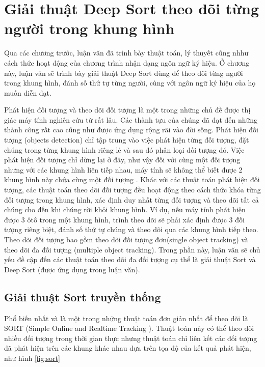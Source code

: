 \chapter{Giải thuật Deep Sort theo dõi từng người trong khung hình}
Qua các chương trước, luận văn đã trình bày thuật toán, lý thuyết cũng nhhư cách thức hoạt động của chương trình nhận dạng ngôn ngữ ký hiệu. Ở chương này, luận văn sẽ trình bày giải thuật Deep Sort dùng để theo dõi từng người trong khung hình, đánh số thứ tự từng người, cùng với ngôn ngữ ký hiệu của họ muốn diễn đạt.

Phát hiện đối tượng và theo dõi đối tượng là một trong những chủ đề được thị giác máy tính nghiên cứu từ rất lâu. Các thành tựu của chúng đã đạt đến những thành công rất cao cũng như được ứng dụng rộng rãi vào đời sống. Phát hiện đối tượng (objects detection) chỉ tập trung vào việc phát hiện từng đối tượng, đặt chúng trong từng khung hình riêng lẻ và sau đó phân loại đối tượng đó. Việc phát hiện đối tượng chỉ dừng lại ở đây, như vậy đối với cùng một đối tượng nhưng với các khung hình liên tiếp nhau, máy tính sẽ không thể biết được 2 khung hình này chứa cùng một đối tượng . Khác với các thuật toán phát hiện đối tượng, các thuật toán theo dõi đối tượng đều hoạt động theo cách thức khóa từng đối tượng trong khung hình, xác định duy nhất từng đối tượng và theo dõi tất cả chúng cho đến khi chúng rời khỏi khung hình. Ví dụ, nếu máy tính phát hiện được 3 ôtô trong một khung hình, trình theo dõi sẽ phải xác định được 3 đối tượng riêng biệt, đánh số thứ tự chúng và theo dõi qua các khung hình tiếp theo. Theo dõi đối tượng bao gồm theo dõi đối tượng đơn(single object tracking) và theo dõi đa đối tượng (multiple object tracking). Trong phần này, luận văn sẽ chủ yếu đề cập đến các thuật toán theo dõi đa đối tượng cụ thể là giải thuật Sort và Deep Sort (được ứng dụng trong luận văn).  
 
\section{Giải thuật Sort truyền thống}
Phổ biến nhất và là một trong những thuật toán đơn giản nhất để theo dõi là SORT (Simple Online and Realtime Tracking \cite{bewley2016simple}). Thuật toán này có thể theo dõi nhiều đối tượng trong thời gian thực nhưng thuật toán chỉ liên kết các đối tượng đã phát hiện trên các khung khác nhau dựa trên tọa độ của kết quả phát hiện, như hình \ref{fig:sort}

